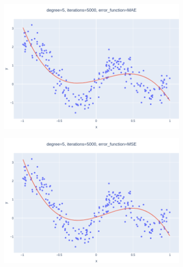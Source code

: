 \documentclass[14pt,a4]{article}
\begin{document}
\begin{figure}[h]
    \centering
    \begin{subfigure}{0.3\linewidth}
        \centering
        \includegraphics[width=\textwidth]{images/implementation/q1/part_c/5_5000_MAE.png}
    \end{subfigure}
    \hfill
    \begin{subfigure}{0.3\textwidth}
        \centering
        \includegraphics[width=\textwidth]{images/implementation/q1/part_c/5_5000_MSE.png}
    \end{subfigure}
    \hfill
    \begin{subfigure}{0.3\linewidth}
        \centering

\end{subfigure}
\end{figure}
\end{document}
